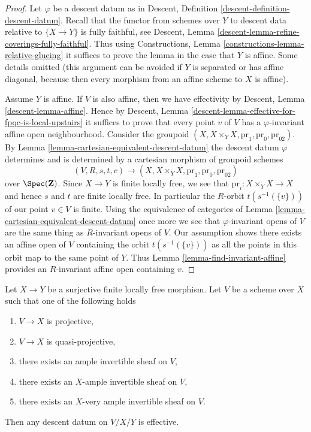 \begin{proof}
Let $\varphi$ be a descent datum as in
Descent, Definition \ref{descent-definition-descent-datum}.
Recall that the functor from schemes over $Y$ to descent data
relative to $\{X \to Y\}$ is fully faithful, see
Descent, Lemma \ref{descent-lemma-refine-coverings-fully-faithful}.
Thus using Constructions, Lemma \ref{constructions-lemma-relative-glueing}
it suffices to prove the lemma in the case that $Y$ is affine.
Some details omitted (this argument can be avoided if $Y$ is
separated or has affine diagonal, because then every morphism from
an affine scheme to $X$ is affine).

\medskip\noindent
Assume $Y$ is affine. If $V$ is also affine, then we have effectivity by
Descent, Lemma \ref{descent-lemma-affine}. Hence by
Descent, Lemma \ref{descent-lemma-effective-for-fpqc-is-local-upstairs}
it suffices to prove that every point $v$ of $V$ has a $\varphi$-invariant
affine open neighbourhood. Consider the groupoid
$(X, X \times_Y X, \text{pr}_1, \text{pr}_0, \text{pr}_{02})$.
By Lemma \ref{lemma-cartesian-equivalent-descent-datum}
the descent datum $\varphi$ determines and is determined by
a cartesian morphism of groupoid schemes
$$
(V, R, s, t, c)
\longrightarrow
(X, X \times_Y X, \text{pr}_1, \text{pr}_0, \text{pr}_{02})
$$
over $\Spec(\mathbf{Z})$.
Since $X \to Y$ is finite locally free, we see that
$\text{pr}_i : X \times_Y X \to X$ and hence $s$ and $t$
are finite locally free. In particular the $R$-orbit
$t(s^{-1}(\{v\}))$ of our point $v \in V$
is finite. Using the equivalence of categories of
Lemma \ref{lemma-cartesian-equivalent-descent-datum}
once more we see that $\varphi$-invariant opens of $V$
are the same thing as $R$-invariant opens of $V$.
Our assumption shows there exists an affine open of $V$
containing the orbit $t(s^{-1}(\{v\}))$ as all the points
in this orbit map to the same point of $Y$.
Thus Lemma \ref{lemma-find-invariant-affine}
provides an $R$-invariant affine open containing $v$.
\end{proof}

\begin{lemma}
\label{lemma-descend-along-finite-quasi-projective}
Let $X \to Y$ be a surjective finite locally free morphism.
Let $V$ be a scheme over $X$ such that one of the following holds
\begin{enumerate}
\item $V \to X$ is projective,
\item $V \to X$ is quasi-projective,
\item there exists an ample invertible sheaf on $V$,
\item there exists an $X$-ample invertible sheaf on $V$,
\item there exists an $X$-very ample invertible sheaf on $V$.
\end{enumerate}
Then any descent datum on $V/X/Y$ is effective.
\end{lemma}

